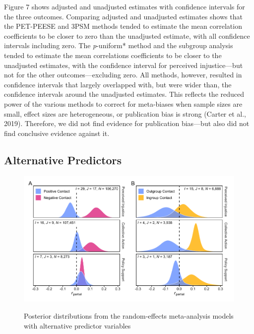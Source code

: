 \documentclass[12pt, letterpaper]{article}
\begin{document}
Figure 7 shows adjusted and unadjusted estimates with confidence
intervals for the three outcomes. Comparing adjusted and unadjusted
estimates shows that the PET-PEESE and 3PSM methods tended to estimate
the mean correlation coefficients to be closer to zero than the
unadjusted estimate, with all confidence intervals including zero. The
\emph{p}-uniform* method and the subgroup analysis tended to estimate
the mean correlations coefficients to be closer to the unadjusted
estimates, with the confidence interval for perceived injustice---but
not for the other outcomes---excluding zero. All methods, however,
resulted in confidence intervals that largely overlapped with, but were
wider than, the confidence intervals around the unadjusted estimates.
This reflects the reduced power of the various methods to correct for
meta-biases when sample sizes are small, effect sizes are heterogeneous,
or publication bias is strong (Carter et al., 2019). Therefore, we did
not find evidence for publication bias---but also did not find
conclusive evidence against it.

\hypertarget{alternative-predictors}{%
\subsection{Alternative Predictors}\label{alternative-predictors}}

\begin{figure}[t!]
\centering
\caption{Posterior distributions from the random-effects meta-analysis models with alternative predictor variables}
\includegraphics[scale=1]{../figures/figure-8}
\label{fig:f8}
\end{figure}
\end{document}
